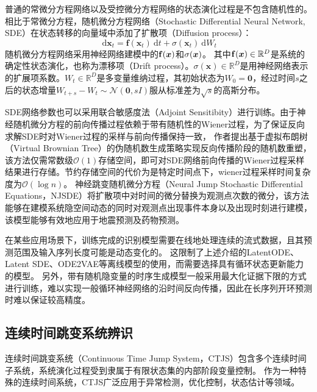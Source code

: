普通的常微分方程网络以及受控微分方程网络的状态演化过程是不包含随机性的。
相比于常微分方程，随机微分方程网络（Stochastic Differential Neural Network, SDE）在状态转移的向量域中添加了扩散项（Diffusion process）：
\begin{equation}
    \mathrm{~d} \mathbf{x}_t=\mathbf{f}\left(\mathbf{x}_t\right) \mathrm{~d} t+\sigma\left(\mathbf{x}_t\right) \mathrm{~d} W_t
    \label{equ:sde}
\end{equation}
随机微分方程网络采用神经网络建模中的$\mathbf{f}(\boldsymbol x)$和$\sigma(\boldsymbol x)$。
其中$\mathbf{f}(\boldsymbol x)\in \mathbb{R}^D$是系统的确定性状态演化，也称为漂移项（Drift process）。$\sigma(\mathbf x)\in \mathbb{R}^D$是用神经网络表示的扩展项系数。$W_t \in \mathbb{R}^D$是多变量维纳过程，其初始状态为$W_0 =\mathbf{0}$，经过时间$s$之后的状态增量$W_{t+s}-W_t \sim \mathcal{N}(\mathbf{0}, s I)$服从标准差为$\sqrt{s}$的高斯分布。

SDE网络参数也可以采用联合敏感度法（Adjoint Sensitibity）进行训练\cite{li2020scalable}。由于神经随机微分方程的前向传播过程依赖于带有随机性的Wiener过程，为了保证反向求解SDE时对Wiener过程的采样与前向传播保持一致，
作者提出基于虚拟布朗树（Virtual Brownian Tree）的伪随机数生成策略实现反向传播阶段的随机数重塑，该方法仅需常数级$\mathcal{O}(1)$存储空间，即可对SDE网络前向传播的Wiener过程采样结果进行存储。节约存储空间的代价为是特定时间点下，wiener过程采样时间复杂度为$\mathcal{O}(\log n)$。
神经跳变随机微分方程（Neural Jump Stochastic Differential Equations，NJSDE）\cite{Jia2019}将扩散项中对时间的微分替换为观测点次数的微分，该方法能够在建模系统隐空间动态的同时对观测点出现事件本身以及出现时刻进行建模，该模型能够有效地应用于地震预测及药物预测。

在某些应用场景下，训练完成的识别模型需要在线地处理连续的流式数据，且其预
测范围及输入序列长度可能是动态变化的\cite{VSDN_Liu2020}。
这限制了上述介绍的LatentODE、Latent SDE、ODE2VAE等离线模型的使用，而需要选择具有循环状态更新能力的模型。
另外，带有随机隐变量的时序生成模型一般采用最大化证据下限的方式进行训练，难以实现一般循环神经网络的沿时间反向传播，因此在长序列开环预测时难以保证较高精度。

\subsection{连续时间跳变系统辨识}
连续时间跳变系统（Continuous Time Jump System，CTJS）包含多个连续时间子系统，系统演化过程受到隶属于有限状态集的内部阶段变量控制\cite{8709809}。
作为一种特殊的连续时间系统，CTJS广泛应用于异常检测\cite{9165930}，优化控制\cite{pmlr-v120-jansch-porto20a}，状态估计\cite{8709809}等领域。

